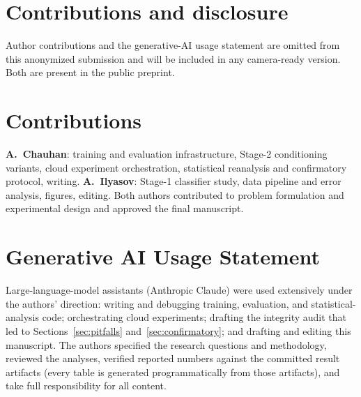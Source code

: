 \label{endofmaintext}
\ifworkshopbuild
\section*{Contributions and disclosure}
Author contributions and the generative-AI usage statement are omitted from
this anonymized submission and will be included in any camera-ready version.
Both are present in the public preprint.
\else
\section*{Contributions}
\textbf{A.~Chauhan}: training and evaluation infrastructure, Stage-2
conditioning variants, cloud experiment orchestration, statistical
reanalysis and confirmatory protocol, writing. \textbf{A.~Ilyasov}:
Stage-1 classifier study, data pipeline and error analysis, figures,
editing. Both authors contributed to problem formulation and experimental
design and approved the final manuscript.

\section*{Generative AI Usage Statement}
Large-language-model assistants (Anthropic Claude) were used extensively
under the authors' direction: writing and debugging training, evaluation,
and statistical-analysis code; orchestrating cloud experiments; drafting
the integrity audit that led to Sections~\ref{sec:pitfalls}
and~\ref{sec:confirmatory}; and drafting and editing this manuscript. The
authors specified the research questions and methodology, reviewed the
analyses, verified reported numbers against the committed result
artifacts (every table is generated programmatically from those
artifacts), and take full responsibility for all content.
\fi
